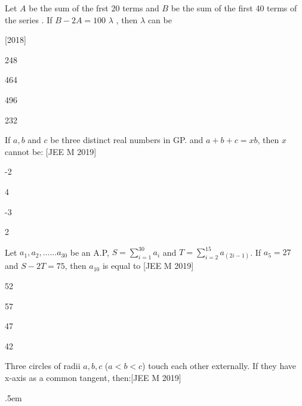   \item{Let $A$ be the sum of the frst 20 terms and $B$ be the sum of the first 40 terms of the series . If $B-2A=100$ $\lambda$ , then $\lambda$ can be \\ \null  \hfill{[2018]\begin{enumerate}
  \begin{multicols}{2}
  \item {248} \item{464}\columnbreak
  \item{496}
  \item{232}
  \end{multicols}
  \end{enumerate}}
  \item{If $a, b$ and $c$ be three distinct real numbers in GP. and $a+b+c=xb$, then $x$ cannot be: \hfill{[JEE M 2019]}
\begin{enumerate}
  \begin{multicols}{2}
  \item {-2} \item{4}\columnbreak
  \item{-3}
  \item{2}
  \end{multicols}
  \end{enumerate}}
  \item {Let $a_{1},a_{2},......a_{30}$ be an A.P, $S=\sum_{i=1}^{30}a_{i}$ and $T=\sum_{i=2}^{15}a_{(2i-1)}$. If $a_{5}=27$
	  and $S-2T=75$, then $a_{10}$ is equal to \null \hfill{[JEE M 2019]}
\begin{enumerate}
  \begin{multicols}{2}
  \item {52} \item{57}\columnbreak
  \item{47}
  \item{42}
  \end{multicols}
  \end{enumerate}}
\item{Three circles of radii $a, b, c$ ($a<b<c$) touch each other externally. If they have x-axis as a common tangent, then:\hfill{[JEE M 2019]}\begin{enumerate} \itemsep.5em	
  

\end{enumerate}}}
